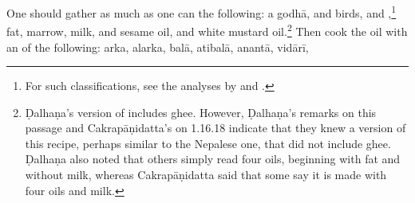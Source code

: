 \begin{translation}
One should gather as much as one can the following: a \gls{godhā}, %
 and  birds, and
,\footnote{For such
    classifications, see the analyses by \citet{zimm-1999} and \citet{smit-1994}.}
    fat, marrow, milk, and sesame oil, and white mustard oil.\footnote{Ḍalhaṇa's
        version of  includes ghee. However, 
        Ḍalhaṇa's
        remarks on this passage and Cakrapāṇidatta's on 1.16.18 \citep[130]{acar-1939}
        indicate that they knew a version of this recipe, perhaps similar to the Nepalese
        one, that did not include ghee. Ḍalhaṇa also noted that others simply read four
        oils, beginning with fat and without milk, whereas Cakrapāṇidatta said that some
        say it is made with four oils and milk.}
Then cook the oil with an  of the
        following: \gls{arka}, %
        \gls{alarka}, %
        \gls{balā}, %
        \gls{atibalā}, %
        \gls{anantā}, %
        \gls{vidārī}, %

\end{translation}
